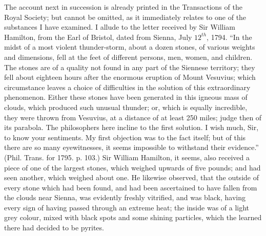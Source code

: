 \documentclass[a4paper, 12pt, oneside, twocolumn]{article}
\begin{document}
The account next in succession is already printed in the Transactions of the Royal Society; but cannot be omitted, as it immediately relates to one of the substances I have examined. I allude to the letter received by Sir William Hamilton, from the Earl of Bristol, dated from Sienna, July $12^{th}$, 1794. ``In the midst of a most violent thunder-storm, about a dozen stones, of various weights and dimensions, fell at the feet of different persons, men, women, and children. The stones are of a quality not found in any part of the Siennese territory; they fell about eighteen hours after the enormous eruption of Mount Vesuvius; which circumstance leaves a choice of difficulties in the solution of this extraordinary phenomenon. Either these stones have been generated in this igneous mass of clouds, which produced such unusual thunder; or, which is equally incredible, they were thrown from Vesuvius, at a distance of at least 250 miles; judge then of its parabola. The philosophers here incline to the first solution. I wish much, Sir, to know your sentiments. My first objection was to the fact itself; but of this there are so many eyewitnesses, it seems impossible to withstand their evidence.'' (Phil. Trans. for 1795. p. 103.) Sir William Hamilton, it seems, also received a piece of one of the largest stones, which weighed upwards of five pounds; and had seen another, which weighed about one. He likewise observed, that the outside of every stone which had been found, and had been ascertained to have fallen from the clouds near Sienna, was evidently freshly vitrified, and was black, having every sign of having passed through an extreme heat; the inside was of a light grey colour, mixed with black spots and some shining particles, which the learned there had decided to be pyrites.
\end{document}
